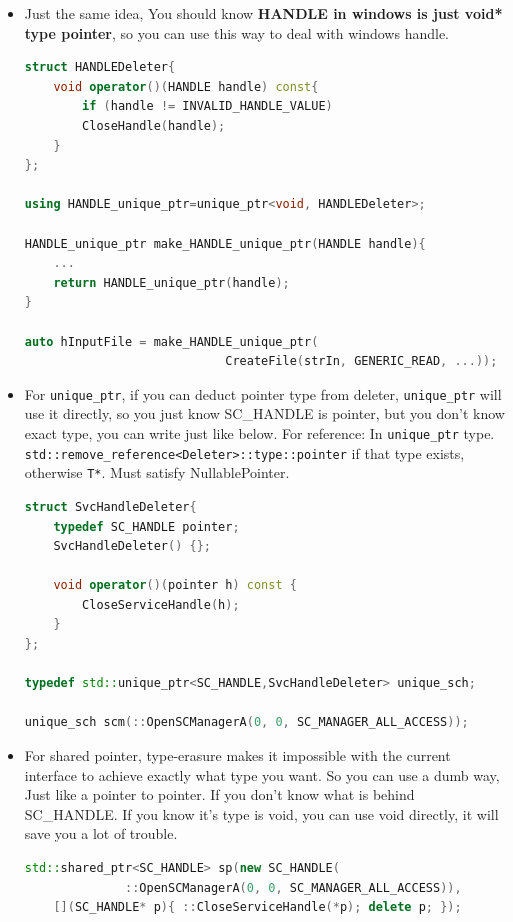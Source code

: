 \documentclass[a4paper,11pt,twoside]{book}
\begin{document}
\begin{itemize}
\item Just the same idea, You should know \textbf{HANDLE in windows is just void* type pointer}, so you can use this way to deal with windows handle.
	
\begin{lstlisting}[frame=single, language=c++]
struct HANDLEDeleter{
	void operator()(HANDLE handle) const{
		if (handle != INVALID_HANDLE_VALUE)
		CloseHandle(handle);
	}
};
	
using HANDLE_unique_ptr=unique_ptr<void, HANDLEDeleter>;
	
HANDLE_unique_ptr make_HANDLE_unique_ptr(HANDLE handle){
	...
	return HANDLE_unique_ptr(handle);
}
	
auto hInputFile = make_HANDLE_unique_ptr(
                            CreateFile(strIn, GENERIC_READ, ...));
\end{lstlisting}
	

	
\item For \texttt{unique\_ptr}, if you can deduct pointer type from deleter, \texttt{unique\_ptr} will use it directly, so you just know SC\_HANDLE is pointer, but you don't know exact type, you can write just like below.  For reference: In \texttt{unique\_ptr} type. \texttt{std::remove\_reference<Deleter>::type::pointer} if that type exists, otherwise \texttt{T*}. Must satisfy NullablePointer.

\begin{lstlisting}[frame=single, language=c++]
struct SvcHandleDeleter{
	typedef SC_HANDLE pointer;
	SvcHandleDeleter() {};
	
	void operator()(pointer h) const {
		CloseServiceHandle(h);
	}
};
	
typedef std::unique_ptr<SC_HANDLE,SvcHandleDeleter> unique_sch;
	
unique_sch scm(::OpenSCManagerA(0, 0, SC_MANAGER_ALL_ACCESS));
\end{lstlisting}
	
	\item For shared pointer, type-erasure makes it impossible with the current interface to achieve exactly what type you want. So you can use a dumb way, Just like a pointer to pointer. If you don't know what is behind SC\_HANDLE. If you know it's type is void, you can use void directly, it will save you a lot of trouble. 
	
\begin{lstlisting}[frame=single, language=c++]
std::shared_ptr<SC_HANDLE> sp(new SC_HANDLE(
              ::OpenSCManagerA(0, 0, SC_MANAGER_ALL_ACCESS)),
	[](SC_HANDLE* p){ ::CloseServiceHandle(*p); delete p; });
\end{lstlisting}


\end{itemize}
\end{document}
